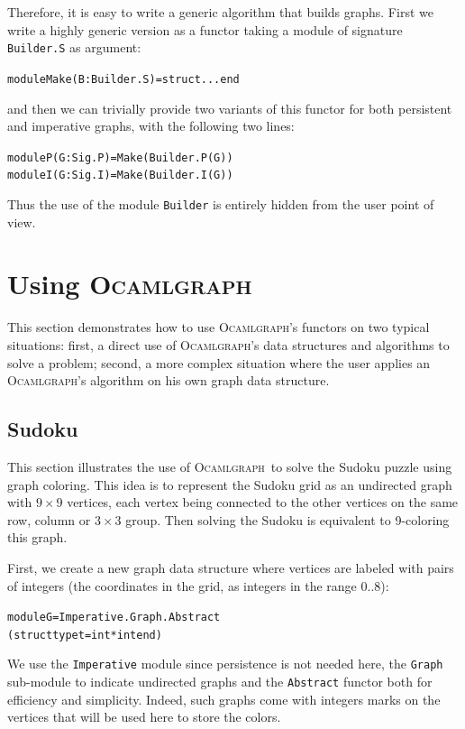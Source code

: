 \documentclass[]{tfp05symp}
\newcommand{\ocamlgraph}{\textsc{Ocamlgraph}\xspace}
\begin{document}
Therefore, it is easy to write a generic algorithm that builds
graphs. First we write a highly generic version as a functor taking a
module of signature \texttt{Builder.S} as argument:
\begin{alltt}
module Make(B : Builder.S) = struct ... end
\end{alltt}
and then we can trivially provide two variants of this functor for
both persistent and imperative graphs, with the following two lines:
\begin{alltt}
module P(G : Sig.P) = Make(Builder.P(G))
module I(G : Sig.I) = Make(Builder.I(G))
\end{alltt}
Thus the use of the module \texttt{Builder} is entirely hidden from
the user point of view.

\section{Using \ocamlgraph}\label{exemples}

This section demonstrates how to use \ocamlgraph's functors on two
typical situations: first, a direct use of \ocamlgraph's data
structures and algorithms to solve a problem; second, a more complex
situation where the user applies an \ocamlgraph's algorithm on his own
graph data structure.

\subsection{Sudoku}

This section illustrates the use of \ocamlgraph\ to solve the Sudoku
puzzle using graph coloring. This idea is to represent the Sudoku grid
as an undirected graph with $9\times 9$ vertices, each vertex being
connected to the other vertices on the same row, column or $3\times 3$
group. Then solving the Sudoku is equivalent to 9-coloring this graph.

First, we create a new graph data structure where vertices are labeled with
pairs of integers (the coordinates in the grid, as integers in the
range 0..8):
\begin{alltt}
module G = Imperative.Graph.Abstract
             (struct type t = int * int end)
\end{alltt}
We use the \texttt{Imperative} module since persistence is not
needed here, the \texttt{Graph} sub-module to indicate undirected
graphs and the \texttt{Abstract} functor both for efficiency and
simplicity. Indeed, such graphs come with integers marks on the vertices
that will be used here to store the colors.
\end{document}
